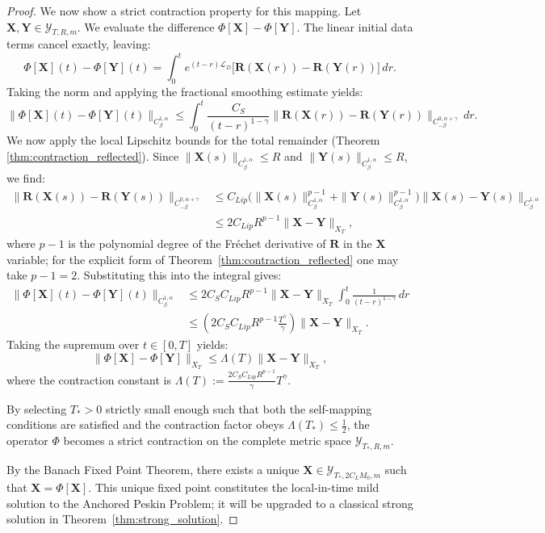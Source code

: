 \documentclass{amsart}
\begin{document}
\begin{proof}
We now show a strict contraction property for this mapping.
Let $\mathbf{X}, \mathbf{Y} \in \mathcal{Y}_{T, R, m}$. We evaluate the difference $\Phi[\mathbf{X}] - \Phi[\mathbf{Y}]$. The linear initial data terms cancel exactly, leaving:
\[
\Phi[\mathbf{X}](t) - \Phi[\mathbf{Y}](t) = \int_0^t e^{(t-r)\mathcal{L}_D} \big[ \mathbf{R}(\mathbf{X}(r)) - \mathbf{R}(\mathbf{Y}(r)) \big] \, dr.
\]
Taking the norm and applying the fractional smoothing estimate yields:
\[
\|\Phi[\mathbf{X}](t) - \Phi[\mathbf{Y}](t)\|_{C^{1,\alpha}_\beta} \le \int_0^t \frac{C_S}{(t-r)^{1-\gamma}} \|\mathbf{R}(\mathbf{X}(r)) - \mathbf{R}(\mathbf{Y}(r))\|_{C^{0,\alpha+\gamma}_{-\beta}} \, dr.
\]
We now apply the local Lipschitz bounds for the total remainder (Theorem \ref{thm:contraction_reflected}). Since $\|\mathbf{X}(s)\|_{C^{1,\alpha}_\beta} \le R$ and $\|\mathbf{Y}(s)\|_{C^{1,\alpha}_\beta} \le R$, we find:
\begin{align*}
\|\mathbf{R}(\mathbf{X}(s)) - \mathbf{R}(\mathbf{Y}(s))\|_{C^{0,\alpha+\gamma}_{-\beta}} 
&\le C_{Lip} \big( \|\mathbf{X}(s)\|_{C^{1,\alpha}_\beta}^{p-1} + \|\mathbf{Y}(s)\|_{C^{1,\alpha}_\beta}^{p-1} \big) \|\mathbf{X}(s) - \mathbf{Y}(s)\|_{C^{1,\alpha}_\beta} \\
&\le 2 C_{Lip} R^{p-1} \|\mathbf{X} - \mathbf{Y}\|_{X_T},
\end{align*}
where $p-1$ is the polynomial degree of the Fréchet derivative of $\mathbf{R}$ in the $\mathbf{X}$ variable; for the explicit form of Theorem~\ref{thm:contraction_reflected} one may take $p-1=2$.
Substituting this into the integral gives:
\begin{align*}
\|\Phi[\mathbf{X}](t) - \Phi[\mathbf{Y}](t)\|_{C^{1,\alpha}_\beta} 
&\le 2 C_S C_{Lip} R^{p-1} \|\mathbf{X} - \mathbf{Y}\|_{X_T} \int_0^t \frac{1}{(t-r)^{1-\gamma}} \, dr \\
&\le \left( 2 C_S C_{Lip} R^{p-1} \frac{T^\gamma}{\gamma} \right) \|\mathbf{X} - \mathbf{Y}\|_{X_T}.
\end{align*}
Taking the supremum over $t \in [0,T]$ yields:
\[
\|\Phi[\mathbf{X}] - \Phi[\mathbf{Y}]\|_{X_T} \le \Lambda(T) \|\mathbf{X} - \mathbf{Y}\|_{X_T},
\]
where the contraction constant is $\Lambda(T) := \frac{2 C_S C_{Lip} R^{p-1}}{\gamma} T^\gamma$. 

By selecting $T_* > 0$ strictly small enough such that both the self-mapping conditions are satisfied and the contraction factor obeys $\Lambda(T_*) \le \frac{1}{2}$, the operator $\Phi$ becomes a strict contraction on the complete metric space $\mathcal{Y}_{T_*, R, m}$.

By the Banach Fixed Point Theorem, there exists a unique $\mathbf{X} \in \mathcal{Y}_{T_*, 2C_L M_0, m}$ such that $\mathbf{X} = \Phi[\mathbf{X}]$. This unique fixed point constitutes the local-in-time mild solution to the Anchored Peskin Problem; it will be upgraded to a classical strong solution in Theorem~\ref{thm:strong_solution}.
\end{proof}
\end{document}
